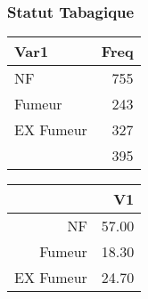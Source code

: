 \documentclass[11pt,a4paper]{article}\usepackage[]{graphicx}\usepackage[]{color}
\begin{document}
    \subsubsection{Statut Tabagique}

\begin{table}[ht]
\centering
\begin{tabular}{lr}
  \hline
Var1 & Freq \\ 
  \hline
NF & 755 \\ 
  Fumeur & 243 \\ 
  EX Fumeur & 327 \\ 
   & 395 \\ 
   \hline
\end{tabular}
\end{table}
\begin{table}[ht]
\centering
\begin{tabular}{rr}
  \hline
 & V1 \\ 
  \hline
NF & 57.00 \\ 
  Fumeur & 18.30 \\ 
  EX Fumeur & 24.70 \\ 
   \hline
\end{tabular}
\end{table}
\end{document}
